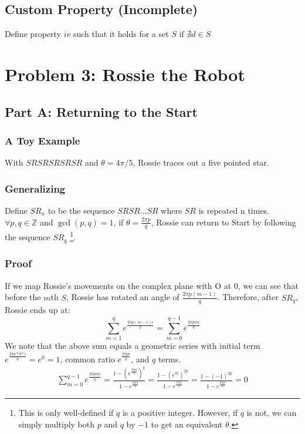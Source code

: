 \documentclass{article}
\begin{document}
  \subsection{Custom Property (Incomplete)}
  Define property $iv$ such that it holds for a set $S$ if $\nexists d \in S$
  \section{Problem 3: Rossie the Robot}
  \subsection{Part A: Returning to the Start}
  \subsubsection{A Toy Example}
  With $SRSRSRSRSR$ and $\theta = 4\pi/5$, Rossie traces out a five pointed star.
  \subsubsection{Generalizing}
  Define $SR_n$ to be the sequence $SRSR...SR$ where $SR$ is repeated n times. $\forall p, q \in \mathbb{Z}$ and $\gcd(p,q) = 1$, if $\theta = \frac{2\pi p}{q}$, Rossie can return to Start by following the sequence $SR_q$  \footnote{This is only well-defined if $q$ is a positive integer. However, if $q$ is not, we can simply multiply both $p$ and $q$ by $-1$ to get an equivalent $\theta$.}.
  \subsubsection{Proof}
   If we map Rossie's movements on the complex plane with O at 0, we can see that before the $m$th $S$, Rossie has rotated an angle of $\frac{2\pi p(m-1)}{q}$. Therefore, after $SR_q$, Rossie ends up at:
  \begin{equation}
    \sum^{q}_{m=1}e^{\frac{2\pi p(m-1)i}{q}} = \sum^{q-1}_{m=0}e^{\frac{2\pi pmi}{q}}
  \end{equation}
  We note that the above sum equals a geometric series with initial term $e^{\frac{2\pi p*0*i}{q}} = e^0 = 1$, common ratio $e^{\frac{2\pi pi}{q}}$, and $q$ terms.
  \begin{align}
    \sum^{q-1}_{m=0}e^{\frac{2\pi pmi}{q}} = \frac{1-(e^{\frac{2\pi pi}{q}})^q}{1-e^{\frac{2\pi pi}{q}}}
    = \frac{1-(e^{\pi i})^{2p}}{1 - e^{\frac{2\pi pi}{q}}}
    = \frac{1-(-1)^{2p}}{1 - e^{\frac{2\pi pi}{q}}}
    = 0
  \end{align}
  
\end{document}
